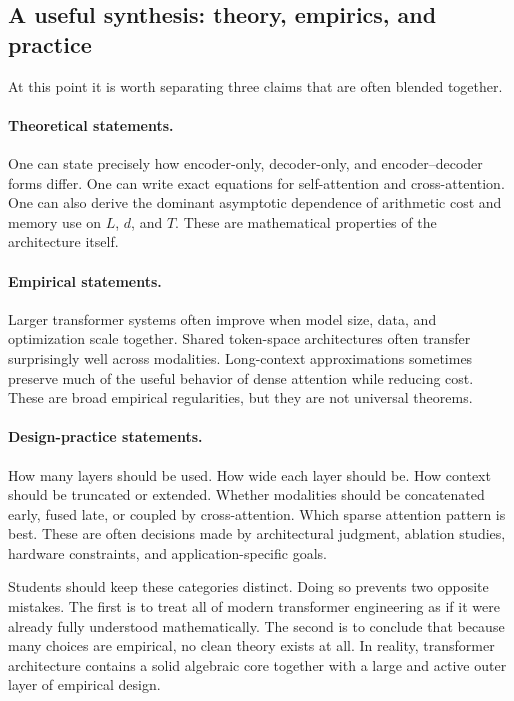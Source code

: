 \subsection*{A useful synthesis: theory, empirics, and practice}

At this point it is worth separating three claims that are often blended together.

\paragraph{Theoretical statements.}
One can state precisely how encoder-only, decoder-only, and encoder--decoder forms differ.
One can write exact equations for self-attention and cross-attention.
One can also derive the dominant asymptotic dependence of arithmetic cost and memory use on \(L\), \(d\), and \(T\).
These are mathematical properties of the architecture itself.

\paragraph{Empirical statements.}
Larger transformer systems often improve when model size, data, and optimization scale together.
Shared token-space architectures often transfer surprisingly well across modalities.
Long-context approximations sometimes preserve much of the useful behavior of dense attention while reducing cost.
These are broad empirical regularities, but they are not universal theorems.

\paragraph{Design-practice statements.}
How many layers should be used.
How wide each layer should be.
How context should be truncated or extended.
Whether modalities should be concatenated early, fused late, or coupled by cross-attention.
Which sparse attention pattern is best.
These are often decisions made by architectural judgment, ablation studies, hardware constraints, and application-specific goals.

Students should keep these categories distinct.
Doing so prevents two opposite mistakes.
The first is to treat all of modern transformer engineering as if it were already fully understood mathematically.
The second is to conclude that because many choices are empirical, no clean theory exists at all.
In reality, transformer architecture contains a solid algebraic core together with a large and active outer layer of empirical design.

